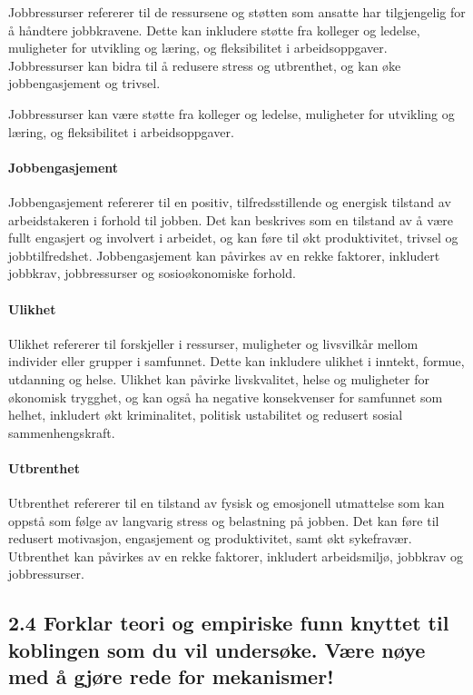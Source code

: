 \documentclass[
  12pt,
  a4paper,
  DIV=11,
  numbers=noendperiod]{scrartcl}
\let\oldparagraph\paragraph
\renewcommand{\paragraph}[1]{\oldparagraph{#1}\mbox{}}
\begin{document}
Jobbressurser refererer til de ressursene og støtten som ansatte har
tilgjengelig for å håndtere jobbkravene. Dette kan inkludere støtte fra
kolleger og ledelse, muligheter for utvikling og læring, og
fleksibilitet i arbeidsoppgaver. Jobbressurser kan bidra til å redusere
stress og utbrenthet, og kan øke jobbengasjement og trivsel.

Jobbressurser kan være støtte fra kolleger og ledelse, muligheter for
utvikling og læring, og fleksibilitet i arbeidsoppgaver.

\paragraph{Jobbengasjement}\label{jobbengasjement}

Jobbengasjement refererer til en positiv, tilfredsstillende og energisk
tilstand av arbeidstakeren i forhold til jobben. Det kan beskrives som
en tilstand av å være fullt engasjert og involvert i arbeidet, og kan
føre til økt produktivitet, trivsel og jobbtilfredshet. Jobbengasjement
kan påvirkes av en rekke faktorer, inkludert jobbkrav, jobbressurser og
sosioøkonomiske forhold.

\paragraph{Ulikhet}\label{ulikhet}

Ulikhet refererer til forskjeller i ressurser, muligheter og livsvilkår
mellom individer eller grupper i samfunnet. Dette kan inkludere ulikhet
i inntekt, formue, utdanning og helse. Ulikhet kan påvirke livskvalitet,
helse og muligheter for økonomisk trygghet, og kan også ha negative
konsekvenser for samfunnet som helhet, inkludert økt kriminalitet,
politisk ustabilitet og redusert sosial sammenhengskraft.

\paragraph{Utbrenthet}\label{utbrenthet}

Utbrenthet refererer til en tilstand av fysisk og emosjonell utmattelse
som kan oppstå som følge av langvarig stress og belastning på jobben.
Det kan føre til redusert motivasjon, engasjement og produktivitet, samt
økt sykefravær. Utbrenthet kan påvirkes av en rekke faktorer, inkludert
arbeidsmiljø, jobbkrav og jobbressurser.

\subsection{2.4 Forklar teori og empiriske funn knyttet til koblingen
som du vil undersøke. Være nøye med å gjøre rede for
mekanismer!}\label{forklar-teori-og-empiriske-funn-knyttet-til-koblingen-som-du-vil-undersuxf8ke.-vuxe6re-nuxf8ye-med-uxe5-gjuxf8re-rede-for-mekanismer}
\end{document}
